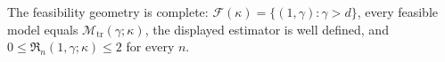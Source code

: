 The feasibility geometry is complete: \(\mathcal F(\kappa)=\{(1,\gamma):\gamma>d\}\), every feasible model equals \(\mathcal M_{\mathrm{tr}}(\gamma;\kappa)\), the displayed estimator is well defined, and \(0\le\mathfrak R_n(1,\gamma;\kappa)\le2\) for every \(n\).